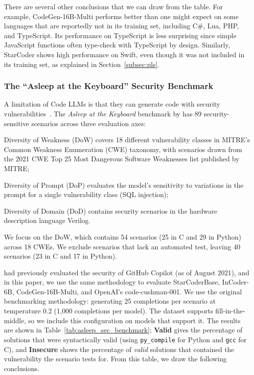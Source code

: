 There are several other conclusions that we can draw from the table. For example, CodeGen-16B-Multi performs better than one might expect on some languages that are reportedly not in its training set, including C\#, Lua, PHP, and TypeScript. Its performance on TypeScript is less surprising since simple JavaScript functions often type-check with TypeScript by design. Similarly, StarCoder shows high performance on Swift, even though it was not included in its training set, as explained in Section~\ref{subsec:pls}.

\subsubsection{The ``Asleep at the Keyboard'' Security Benchmark}

A limitation of Code LLMs is that they can generate code with security vulnerabilities~\citep{pearce2022copilotsec}. The \emph{Asleep at the Keyboard} benchmark by \citet{pearce2022copilotsec} has 89 security-sensitive scenarios across three evaluation axes:

\begin{inparaenum}[(1)]
\item Diversity of Weakness (DoW) covers 18 different vulnerability classes in MITRE's Common Weakness Enumeration (CWE) taxonomy, with scenarios drawn from the 2021 CWE Top 25 Most Dangerous Software Weaknesses list published by MITRE;
\item Diversity of Prompt (DoP) evaluates the model's sensitivity to variations in the prompt for a single vulnerability class (SQL injection);
\item Diversity of Domain (DoD) contains security scenarios in the hardware description language Verilog. 
\end{inparaenum}

We focus on the DoW, which contains 54 scenarios (25 in C and 29 in Python) across 18 CWEs. We exclude scenarios that lack an automated test, leaving 40 scenarios (23 in C and 17 in Python).

\citet{pearce2022copilotsec} had previously evaluated the security of GitHub Copilot (as of August 2021), and in this paper, we use the same methodology to evaluate StarCoderBase, InCoder-6B, CodeGen-16B-Multi, and OpenAI's code-cushman-001. We use the original benchmarking methodology: generating 25 completions per scenario at temperature 0.2 (1,000 completions per model). The dataset supports fill-in-the-middle, so we include this configuration on models that support it. The results are shown in Table~\ref{tab:asleep_sec_benchmark}; \textbf{Valid} gives the percentage of solutions that were syntactically valid (using \texttt{py\_compile} for Python and \texttt{gcc} for C), and \textbf{Insecure} shows the percentage of \emph{valid} solutions that contained the vulnerability the scenario tests for. From this table, we draw the following conclusions.

